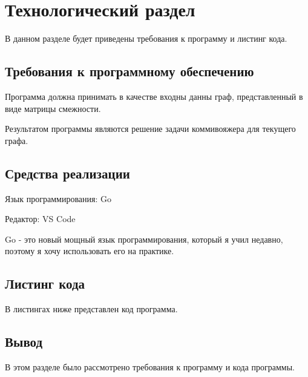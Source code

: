 \chapter{Технологический раздел}
\label{cha:impl}

В данном разделе будет приведены требования к программу и листинг кода.

\section{Требования к программному обеспечению}

Программа должна принимать в качестве входны данны граф, представленный в виде матрицы смежности.

Результатом программы являются решение задачи коммивояжера для текущего графа.


\section{Средства реализации}

Язык программирования: Go

Редактор: VS Code

Go - это новый мощный язык программирования,
который я учил недавно, поэтому я хочу использовать его на практике.



\section{Листинг кода}

В листингах ниже представлен код программа.







\section{Вывод}

В этом разделе было рассмотрено требования к программу и кода программы.
